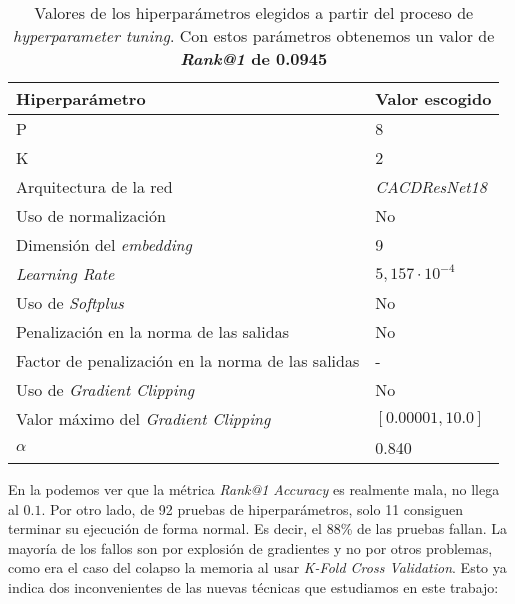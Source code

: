 \begin{table}[!hbt]
\centering
\begin{tabular}{|l|l|}
    \hline
    \textbf{Hiperparámetro}                           & \textbf{Valor escogido} \\
    \hline
    P                                                 & 8                     \\
    K                                                 & 2                     \\
    Arquitectura de la red                            & \textit{CACDResNet18} \\
    Uso de normalización                              & No                    \\
    Dimensión del \textit{embedding}                  & 9                     \\
    \textit{Learning Rate}                            & $5,157 \cdot 10^{-4}$ \\
    Uso de \textit{Softplus}                          & No                    \\
    Penalización en la norma de las salidas           & No                    \\
    Factor de penalización en la norma de las salidas & -                     \\
    Uso de \textit{Gradient Clipping}                 & No                    \\
    Valor máximo del \textit{Gradient Clipping}       & $[0.00001, 10.0]$     \\
    $\alpha$                                          & 0.840                 \\

    \hline
\end{tabular}
\caption{Valores de los hiperparámetros elegidos a partir del proceso de \textit{hyperparameter tuning}. Con estos parámetros obtenemos un valor de \textbf{\textit{Rank@1} de 0.0945}}
\label{table:hp_escogidos}
\end{table}

En la  podemos ver que la métrica \textit{Rank@1 Accuracy} es realmente mala, no llega al $0.1$. Por otro lado, de 92 pruebas de hiperparámetros, solo 11 consiguen terminar su ejecución de forma normal. Es decir, el 88\% de las pruebas fallan. La mayoría de los fallos son por explosión de gradientes y no por otros problemas, como era el caso del colapso la memoria al usar \textit{K-Fold Cross Validation}. Esto ya indica dos inconvenientes de las nuevas técnicas que estudiamos en este trabajo:

